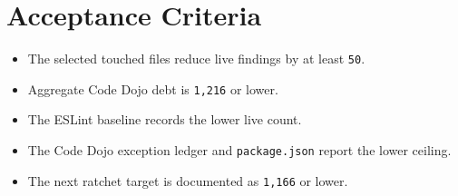 \section{Acceptance Criteria}\label{record-231-acceptance-criteria}

\begin{itemize}
\tightlist
\item
  The selected touched files reduce live findings by at least \texttt{5\allowbreak{}0}.
\item
  Aggregate Code Dojo debt is \texttt{1\allowbreak{},\allowbreak{}2\allowbreak{}1\allowbreak{}6} or lower.
\item
  The ESLint baseline records the lower live count.
\item
  The Code Dojo exception ledger and \texttt{p\allowbreak{}a\allowbreak{}c\allowbreak{}k\allowbreak{}a\allowbreak{}g\allowbreak{}e\allowbreak{}.\allowbreak{}j\allowbreak{}s\allowbreak{}o\allowbreak{}n} report the lower ceiling.
\item
  The next ratchet target is documented as \texttt{1\allowbreak{},\allowbreak{}1\allowbreak{}6\allowbreak{}6} or lower.
\end{itemize}

